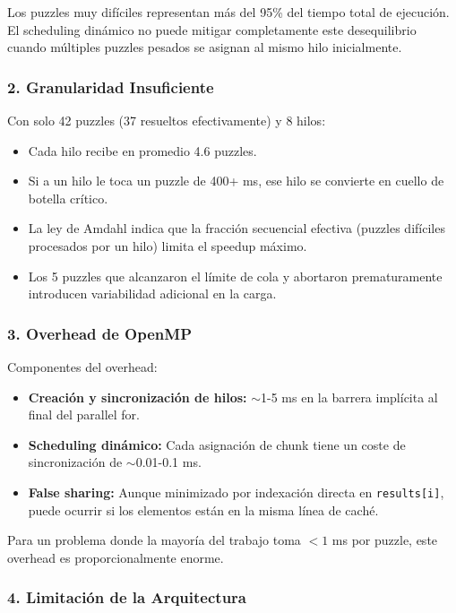 \documentclass[12pt,a4paper]{article}
\begin{document}
Los puzzles muy difíciles representan más del 95\% del tiempo total de ejecución. El scheduling dinámico no puede mitigar completamente este desequilibrio cuando múltiples puzzles pesados se asignan al mismo hilo inicialmente.

\subsubsection{2. Granularidad Insuficiente}

Con solo 42 puzzles (37 resueltos efectivamente) y 8 hilos:
\begin{itemize}
    \item Cada hilo recibe en promedio 4.6 puzzles.
    \item Si a un hilo le toca un puzzle de 400+ ms, ese hilo se convierte en cuello de botella crítico.
    \item La ley de Amdahl indica que la fracción secuencial efectiva (puzzles difíciles procesados por un hilo) limita el speedup máximo.
    \item Los 5 puzzles que alcanzaron el límite de cola y abortaron prematuramente introducen variabilidad adicional en la carga.
\end{itemize}

\subsubsection{3. Overhead de OpenMP}

Componentes del overhead:
\begin{itemize}
    \item \textbf{Creación y sincronización de hilos:} $\sim$1-5 ms en la barrera implícita al final del parallel for.
    \item \textbf{Scheduling dinámico:} Cada asignación de chunk tiene un coste de sincronización de $\sim$0.01-0.1 ms.
    \item \textbf{False sharing:} Aunque minimizado por indexación directa en \texttt{results[i]}, puede ocurrir si los elementos están en la misma línea de caché.
\end{itemize}

Para un problema donde la mayoría del trabajo toma $<1$ ms por puzzle, este overhead es proporcionalmente enorme.

\subsubsection{4. Limitación de la Arquitectura}
\end{document}

